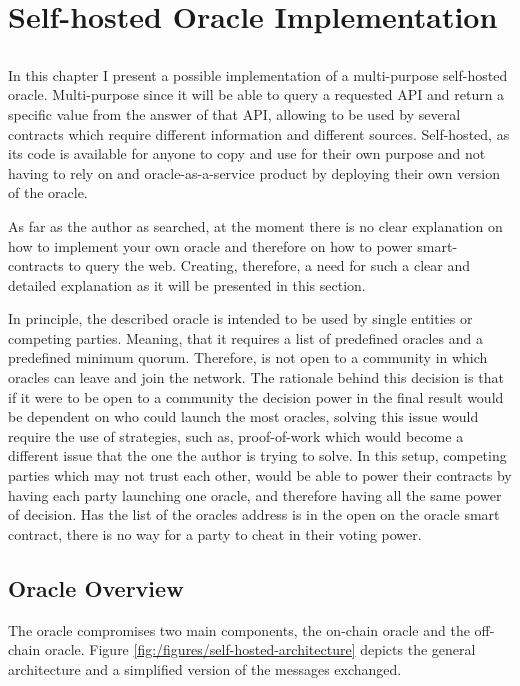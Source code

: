 \chapter{Self-hosted Oracle Implementation} \label{chap:concl}

\section*{}

In this chapter I present a possible implementation of a multi-purpose self-hosted oracle. Multi-purpose since it will be able to query a requested API and return a specific value from the answer of that API, allowing to be used by several contracts which require different information and different sources. Self-hosted, as its code is available for anyone to copy and use for their own purpose and not having to rely on and oracle-as-a-service product by deploying their own version of the oracle.

As far as the author as searched, at the moment there is no clear explanation on how to implement your own oracle and therefore on how to power smart-contracts to query the web. Creating, therefore, a need for such a clear and detailed explanation as it will be presented in this section.

In principle, the described oracle is intended to be used by single entities or competing parties. Meaning, that it requires a list of predefined oracles and a predefined minimum quorum. Therefore, is not open to a community in which oracles can leave and join the network. The rationale behind this decision is that if it were to be open to a community the decision power in the final result would be dependent on who could launch the most oracles, solving this issue would require  the use of strategies, such as, proof-of-work which would become a different issue that the one the author is trying to solve.
In this setup, competing parties which may not trust each other, would be able to power their contracts by having each party launching one oracle, and therefore having all the same power of decision. Has the list of the oracles address is in the open on the oracle smart contract, there is no way for a party to cheat in their voting power.

\section{Oracle Overview}

The oracle compromises two main components, the on-chain oracle and the off-chain oracle. Figure \ref{fig:/figures/self-hosted-architecture} depicts the general architecture and a simplified version of the messages exchanged.

